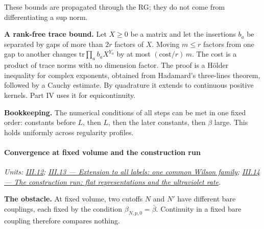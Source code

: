 \documentclass[
  letterpaper,
  11pt]{article}
\begin{document}
These bounds are propagated through the RG; they do not come from
differentiating a sup norm.

\textbf{A rank-free trace bound.} Let \(X\ge0\) be a matrix and let the
insertions \(b_a\) be separated by gaps of more than \(2r\) factors of
\(X\). Moving \(m\le r\) factors from one gap to another changes
\(\mathrm{tr}\prod_ab_aX^{Y_a}\) by at most \((\mathrm{cost}/r)\,m\).
The cost is a product of trace norms with no dimension factor. The proof
is a Hölder inequality for complex exponents, obtained from Hadamard's
three-lines theorem, followed by a Cauchy estimate. By quadrature it
extends to continuous positive kernels. Part IV uses it for
equicontinuity.

\textbf{Bookkeeping.} The numerical conditions of all steps can be met
in one fixed order: constants before \(L\), then \(L\), then the later
constants, then \(\beta\) large. This holds uniformly across regularity
profiles.

\paragraph{Convergence at fixed volume and the construction
run}\label{convergence-at-fixed-volume-and-the-construction-run}

\emph{Units:
\href{https://github.com/scottnarmstrong/yang-mills-informalization/blob/main/outline/units/III-12.md}{III.12};
\href{https://github.com/scottnarmstrong/yang-mills-informalization/blob/main/outline/units/III-13.md}{III.13
--- Extension to all labels: one common Wilson family};
\href{https://github.com/scottnarmstrong/yang-mills-informalization/blob/main/outline/units/III-14.md}{III.14
--- The construction run: flat representations and the ultraviolet
rate}.}

\textbf{The obstacle.} At fixed volume, two cutoffs \(N\) and \(N'\)
have different bare couplings, each fixed by the condition
\(\beta_{N,p,0}=\bar\beta\). Continuity in a fixed bare coupling
therefore compares nothing.
\end{document}
